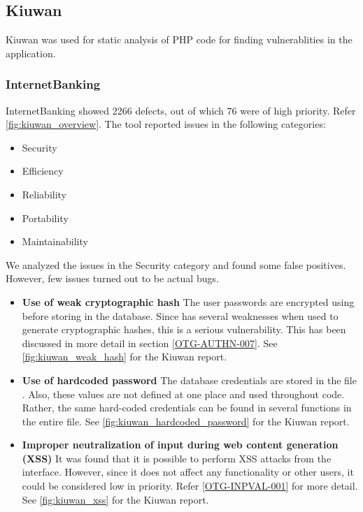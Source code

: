 \subsection{Kiuwan}
Kiuwan was used for static analysis of PHP code for finding vulnerablities in the application.
\subsubsection{InternetBanking}
InternetBanking showed 2266 defects, out of which 76 were of high priority. Refer \ref{fig:kiuwan_overview}. The tool reported issues in the following categories:
\begin{itemize}
    \item Security
    \item Efficiency
    \item Reliability
    \item Portability
    \item Maintainability
\end{itemize}
We analyzed the issues in the Security category and found some false positives. However, few issues turned out to be actual bugs.
\begin{itemize}
	\item \textbf{Use of weak cryptographic hash} The user passwords are encrypted using  before storing in the database. Since  has several weaknesses when used to generate cryptographic hashes, this is a serious vulnerability. This has been discussed in more detail in section \ref{OTG-AUTHN-007}. See \ref{fig:kiuwan_weak_hash} for the Kiuwan report.
	\item \textbf{Use of hardcoded password} The database credentials are stored in the file . Also, these values are not defined at one place and used throughout code. Rather, the same hard-coded credentials can be found in several functions in the entire file. See \ref{fig:kiuwan_hardcoded_password} for the Kiuwan report.
	\item \textbf{Improper neutralization of input during web content generation (XSS)} It was found that it is possible to perform XSS attacks from the  interface. However, since it does not affect any functionality or other users, it could be considered low in priority. Refer \ref{OTG-INPVAL-001} for more detail. See \ref{fig:kiuwan_xss} for the Kiuwan report.
\end{itemize}

